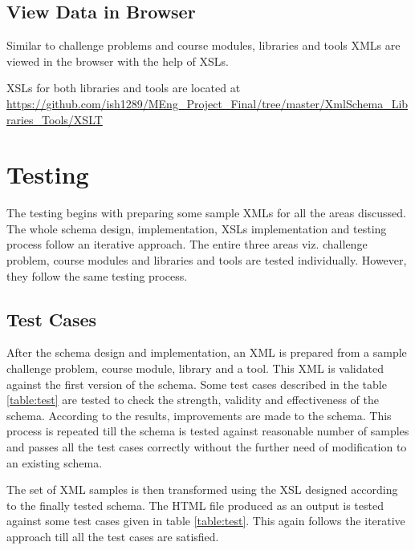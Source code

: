 \documentclass[11pt,letterpaper]{report}
\begin{document}
\section*{View Data in Browser}
Similar to challenge problems and course modules, libraries and tools XMLs are viewed in the browser with the help of XSLs. 

XSLs for both libraries and tools are located at 
\url{https://github.com/ish1289/MEng_Project_Final/tree/master/XmlSchema_Libraries_Tools/XSLT}


\chapter{Testing}

The testing begins with preparing some sample XMLs for all the areas discussed. The whole schema design, implementation, XSLs implementation and testing process follow an iterative approach. The entire three areas viz. challenge problem, course modules and libraries and tools are tested individually. However, they follow the same testing process. 
 
\section{Test Cases}
After the schema design and implementation, an XML is prepared from a sample challenge problem, course module, library and a tool. This XML is validated against the first version of the schema. Some test cases described in the table \ref{table:test} are tested to check the strength, validity and effectiveness of the schema. According to the results, improvements are made to the schema. This process is repeated till the schema is tested against reasonable number of samples and passes all the test cases correctly without the further need of modification to an existing schema. 

The set of XML samples is then transformed using the XSL designed according to the finally tested schema. The HTML file produced as an output is tested against some test cases given in table \ref{table:test}. This again follows the iterative approach till all the test cases are satisfied.
\end{document}
